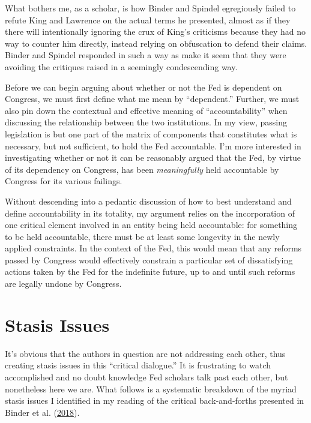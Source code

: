 \documentclass[
  12pt,
]{article}
\begin{document}
What bothers me, as a scholar, is how Binder and Spindel egregiously
failed to refute King and Lawrence on the actual terms he presented,
almost as if they there will intentionally ignoring the crux of King's
criticisms because they had no way to counter him directly, instead
relying on obfuscation to defend their claims. Binder and Spindel
responded in such a way as make it seem that they were avoiding the
critiques raised in a seemingly condescending way.

Before we can begin arguing about whether or not the Fed is dependent on
Congress, we must first define what me mean by ``dependent.'' Further,
we must also pin down the contextual and effective meaning of
``accountability'' when discussing the relationship between the two
institutions. In my view, passing legislation is but one part of the
matrix of components that constitutes what is necessary, but not
sufficient, to hold the Fed accountable. I'm more interested in
investigating whether or not it can be reasonably argued that the Fed,
by virtue of its dependency on Congress, has been \emph{meaningfully}
held accountable by Congress for its various failings.

Without descending into a pedantic discussion of how to best understand
and define accountability in its totality, my argument relies on the
incorporation of one critical element involved in an entity being held
accountable: for something to be held accountable, there must be at
least some longevity in the newly applied constraints. In the context of
the Fed, this would mean that any reforms passed by Congress would
effectively constrain a particular set of dissatisfying actions taken by
the Fed for the indefinite future, up to and until such reforms are
legally undone by Congress.

\hypertarget{stasis-issues}{%
\section{Stasis Issues}\label{stasis-issues}}

It's obvious that the authors in question are not addressing each other,
thus creating stasis issues in this ``critical dialogue.'' It is
frustrating to watch accomplished and no doubt knowledge Fed scholars
talk past each other, but nonetheless here we are. What follows is a
systematic breakdown of the myriad stasis issues I identified in my
reading of the critical back-and-forths presented in Binder et al.
(\protect\hyperlink{ref-binder2018c}{2018}).
\end{document}
